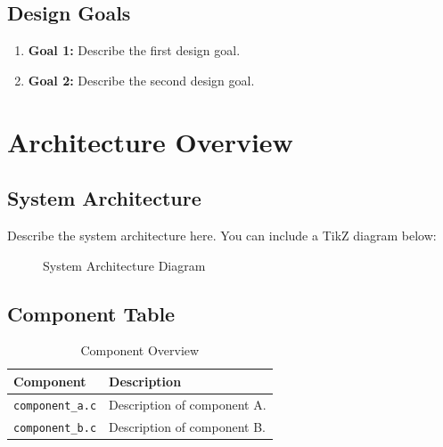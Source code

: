 \documentclass[11pt,a4paper]{article}
\begin{document}
\subsection{Design Goals}
\begin{enumerate}
    \item \textbf{Goal 1:} Describe the first design goal.
    \item \textbf{Goal 2:} Describe the second design goal.
\end{enumerate}

\newpage

\section{Architecture Overview}

\subsection{System Architecture}
Describe the system architecture here. You can include a TikZ diagram below:

\begin{figure}[H]
    \centering
    \caption{System Architecture Diagram}
\end{figure}

\subsection{Component Table}
\begin{table}[H]
    \centering
    \begin{tabularx}{\textwidth}{@{}lX@{}}
        \toprule
        \textbf{Component} & \textbf{Description} \\
        \midrule
        \texttt{component\_a.c} & Description of component A. \\
        \texttt{component\_b.c} & Description of component B. \\
        \bottomrule
    \end{tabularx}
    \caption{Component Overview}
\end{table}
\end{document}
